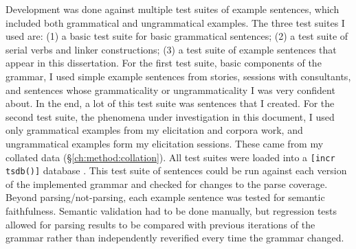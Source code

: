 
Development was done against multiple test suites of example sentences, which included both grammatical and ungrammatical examples. The three test suites I used are: (1) a basic test suite for basic grammatical sentences; (2) a test suite of serial verbs and linker constructions; (3) a test suite of example sentences that appear in this dissertation. For the first test suite, basic components of the grammar, I used simple example sentences from stories, sessions with consultants, and sentences whose grammaticality or ungrammaticality I was very confident about. In the end, a lot of this test suite was sentences that I created. For the second test suite, the phenomena under investigation in this document, I used only grammatical examples from my elicitation and corpora work, and ungrammatical examples form my elicitation sessions. These came from my collated data (\S\ref{ch:method:collation}).  All test suites were loaded into a \texttt{[incr tsdb()]} database \citep{oepen2001}. This test suite of sentences could be run against each version of the implemented grammar and checked for changes to the parse coverage. Beyond parsing/not-parsing, each example sentence was tested for semantic faithfulness. Semantic validation had to be done manually, but regression tests allowed for parsing results to be compared with previous iterations of the grammar rather than independently reverified every time the grammar changed.

